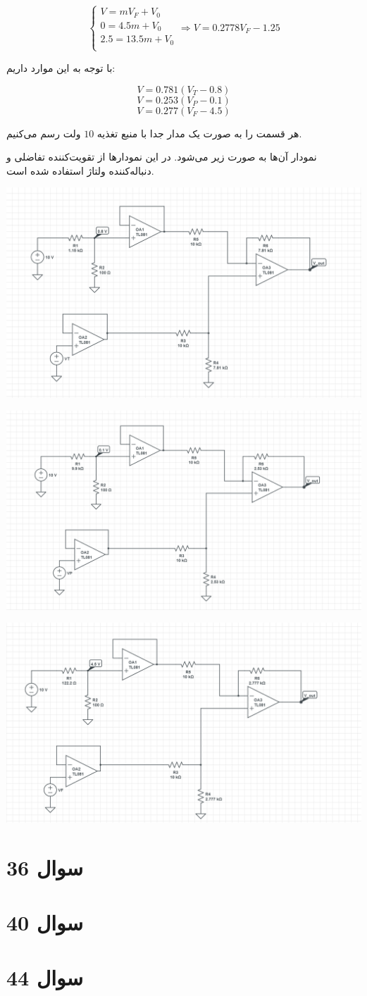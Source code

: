 \documentclass[12pt]{article}
\begin{document}
$$\left\{\begin{array}{c}
	V = m V_F + V_0\\
	0 = 4.5 m + V_0\\
	2.5 = 13.5 m + V_0\\
\end{array}\right. \Rightarrow V=0.2778V_F - 1.25$$


با توجه به این موارد داریم:

$$V=0.781 (V_T - 0.8)$$
$$V=0.253(V_P - 0.1)$$
$$V=0.277(V_F -4.5)$$

هر قسمت را به صورت یک مدار جدا با منبع تغذیه $10$ ولت رسم می‌کنیم.

نمودار آن‌ها به صورت زیر می‌شود. در این نمودارها از تقویت‌کننده تفاضلی و دنباله‌کننده ولتاژ استفاده شده است.


\begin{center}
	\includegraphics[width = 0.5 \textwidth]{images/2.png}
\end{center}

\begin{center}
	\includegraphics[width = 0.5 \textwidth]{images/3.png}
\end{center}

\begin{center}
	\includegraphics[width = 0.5 \textwidth]{images/4.png}
\end{center}

\section*{سوال 36}


\section*{سوال 40}

\section*{سوال 44}

 
\end{document}
